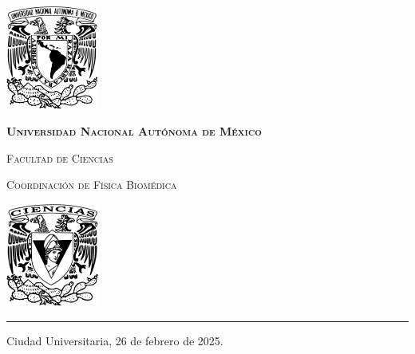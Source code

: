 \documentclass[9pt,letterpaper]{article}
\begin{document}
	
	
	\begin{center}
		\begin{minipage}{3cm}
			\begin{center}
				\includegraphics[height=3.4cm]{../Figuras/Logo_UNAM (1)}
			\end{center}
		\end{minipage}\hfill
		\begin{minipage}{10cm}
			\begin{center}
				{\scshape\LARGE \textbf{Universidad Nacional Autónoma de México} \par}
				{\scshape\Large Facultad de Ciencias\par}
				{\scshape\Large Coordinación de Física Biomédica\par}
			\end{center}
		\end{minipage}\hfill
		\begin{minipage}{3cm}
			\begin{center}
				\includegraphics[height=3.4cm]{../Figuras/Logo_FC (1)}
			\end{center}
		\end{minipage}
	\end{center}
	
	\rule{17cm}{0.1mm}
	
	\hspace{0.5cm}
	
	\parbox{\textwidth}{\raggedleft Ciudad Universitaria, 26 de febrero de 2025.}
	
		\hspace{1cm}
	
		\vspace{0.5cm}
	 
\end{document}
